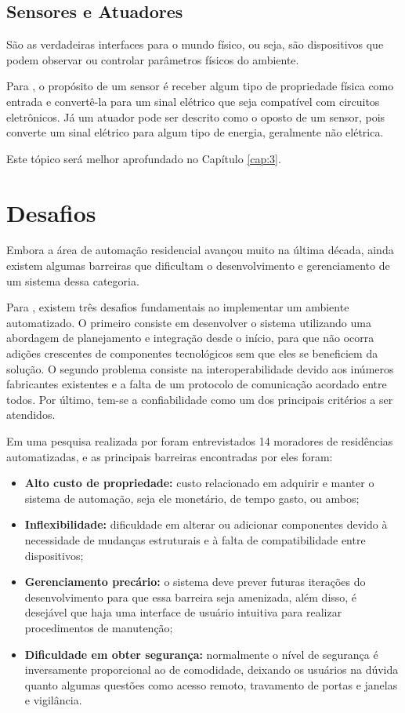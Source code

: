 \subsection{Sensores e Atuadores}
São as verdadeiras interfaces para o mundo físico, ou seja, são dispositivos que podem observar ou controlar
parâmetros físicos do ambiente. \cite{karl_willig2005}

Para , o propósito de um sensor é receber algum tipo de propriedade física como
entrada e convertê-la para um sinal elétrico que seja compatível com circuitos eletrônicos. Já um atuador
pode ser descrito como o oposto de um sensor, pois converte um sinal elétrico para algum tipo de energia,
geralmente não elétrica.

Este tópico será melhor aprofundado no Capítulo \ref{cap:3}.

\section{Desafios}
Embora a área de automação residencial avançou muito na última década, ainda existem algumas barreiras que
dificultam o desenvolvimento e gerenciamento de um sistema dessa categoria.

Para , existem três desafios fundamentais ao implementar um ambiente
automatizado. O primeiro consiste em desenvolver o sistema utilizando uma abordagem de planejamento e
integração desde o início, para que não ocorra adições crescentes de componentes tecnológicos sem que eles se
beneficiem da solução. O segundo problema consiste na interoperabilidade devido aos inúmeros fabricantes
existentes e a falta de um protocolo de comunicação acordado entre todos. Por último, tem-se a confiabilidade
como um dos principais critérios a ser atendidos.

Em uma pesquisa realizada por  foram entrevistados 14 moradores de
residências automatizadas, e as principais barreiras encontradas por eles foram:
\begin{itemize}
	\item \textbf{Alto custo de propriedade:} custo relacionado em adquirir e manter o sistema de automação, seja
	ele monetário, de tempo gasto, ou ambos;
	\item \textbf{Inflexibilidade:} dificuldade em alterar ou adicionar componentes devido à necessidade de
	mudanças estruturais e à falta de compatibilidade entre dispositivos;
	\item \textbf{Gerenciamento precário:} o sistema deve prever futuras iterações do desenvolvimento para que
	essa barreira seja amenizada, além disso, é desejável que haja uma interface de usuário intuitiva
	para realizar procedimentos de manutenção;
	\item \textbf{Dificuldade em obter segurança:}  normalmente o nível de segurança é inversamente
	proporcional ao de comodidade, deixando os usuários na dúvida quanto algumas questões como acesso
	remoto, travamento de portas e janelas e vigilância.
\end{itemize}

